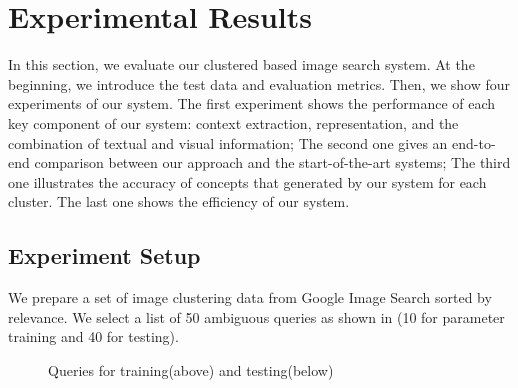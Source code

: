 \section{Experimental Results}
\label{sec:eval}
In this section, we evaluate our clustered based image search system.
At the beginning, we introduce the test data and evaluation metrics.
Then, we show four experiments of our system.
The first experiment shows the performance of each key component
of our system: context extraction, representation, and
 the combination of textual and visual information;
The second one gives an end-to-end comparison between our
 approach and the start-of-the-art systems;
The third one illustrates the accuracy of concepts that generated
by our system for each cluster.
The last one shows the efficiency of our system.


\subsection{Experiment Setup}

We prepare a set of image clustering data from Google Image Search
sorted by relevance.
We select a list of 50 ambiguous queries as shown in 
(10 for parameter training and 40 for testing).

\begin{figure}
\centering
{}
\caption{Queries for training(above) and testing(below)}
\label{fig:data}
\vspace*{-2mm}
\end{figure}

